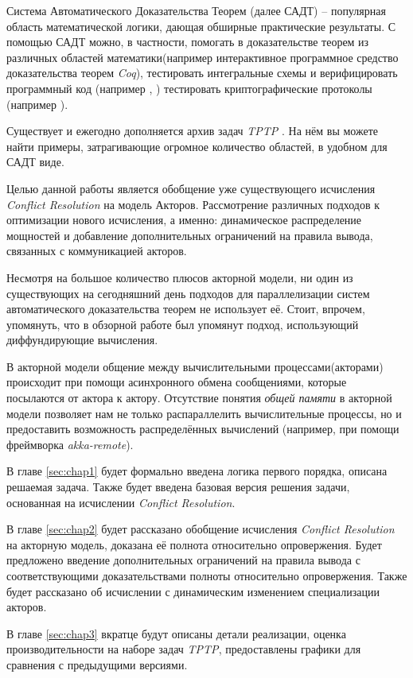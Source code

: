 \startprefacepage

Система Автоматического Доказательства Теорем (далее САДТ) -- популярная область математической логики, дающая обширные практические результаты. С помощью САДТ можно, в частности, помогать в доказательстве теорем из различных областей математики(например интерактивное программное средство доказательства теорем \emph{Coq}), тестировать интегральные схемы и верифицировать программный код (например \cite{Detlefs:2005:STP:1066100.1066102}, \cite{zap-automated-theorem-proving-for-software-analysis}) тестировать криптографические протоколы (например \cite{DBLP:journals/corr/MoranW17}).


Существует и ежегодно дополняется архив задач \emph{TPTP} \cite{Sutcliffe2009}. На нём вы можете найти примеры, затрагивающие огромное количество областей, в удобном для САДТ виде.


Целью данной работы является обобщение уже существующего исчисления \emph{Conflict Resolution} \cite{DBLP:journals/corr/SlaneyP16} на модель Акторов. Рассмотрение различных подходов к оптимизации нового исчисления, а именно: динамическое распределение мощностей и добавление дополнительных ограничений на правила вывода, связанных с коммуникацией акторов.


Несмотря на большое количество плюсов акторной модели, ни один из существующих на сегодняшний день подходов для параллелизации систем автоматического доказательства теорем не использует её. Стоит, впрочем, упомянуть, что в обзорной работе \cite{Bonacina2018} был упомянут подход, использующий диффундирующие вычисления. 

В акторной модели общение между вычислительными процессами(акторами) происходит при помощи асинхронного обмена сообщениями, которые посылаются от актора к актору. Отсутствие понятия \emph{общей памяти} в акторной модели позволяет нам не только распараллелить вычислительные процессы, но и предоставить возможность распределённых вычислений (например, при помощи фреймворка \emph{akka-remote}).


В главе \ref{sec:chap1} будет формально введена логика первого порядка, описана решаемая задача. Также будет введена базовая версия решения задачи, основанная на исчислении \emph{Conflict Resolution}. 


В главе \ref{sec:chap2} будет рассказано обобщение исчисления \emph{Conflict Resolution} на акторную модель, доказана её полнота относительно опровержения. Будет предложено введение дополнительных ограничений на правила вывода с соответствующими доказательствами полноты относительно опровержения. Также будет рассказано об исчислении с динамическим изменением специализации акторов.

В главе \ref{sec:chap3} вкратце будут описаны детали реализации, оценка производительности на наборе задач \emph{TPTP}, предоставлены графики для сравнения с предыдущими версиями.